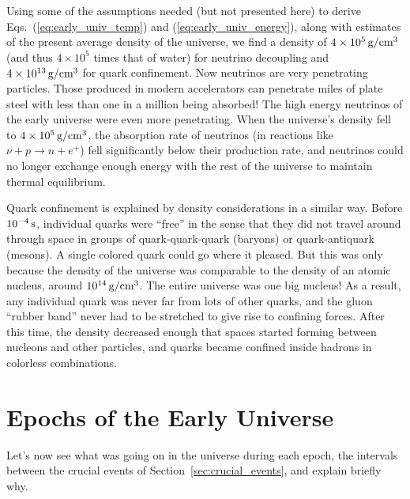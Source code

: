 Using some of the assumptions needed (but not presented here) to
derive Eqs.~(\ref{eq:early_univ_temp}) and
(\ref{eq:early_univ_energy}), along with estimates of the present
average density of the universe, we find a density of $4\times
10^5\,\mbox{g/cm$^3$}$ (and thus $4\times 10^5$ times that of water) for
neutrino decoupling and $4\times 10^{13}\,\mbox{g/cm$^3$}$ for quark
confinement.  Now neutrinos are very penetrating particles. Those
produced in modern accelerators can penetrate miles of plate steel
with less than one in a million being absorbed!  The high energy
neutrinos of the early universe were even more penetrating.  When the
universe's density fell to $4\times 10^5\,\mbox{g/cm$^3$}$, the absorption
rate of neutrinos (in reactions like $\nu+p \to n + e^+$) fell
significantly below their production rate, and neutrinos could no
longer exchange enough energy with the rest of the universe to
maintain thermal equilibrium.

Quark confinement is explained by density considerations in a similar
way.  Before $10^{-4}\,\mbox{s}$, individual quarks were ``free'' in
the sense that they did not travel around through space in groups of
quark-quark-quark (baryons) or quark-antiquark (mesons).  A single
colored quark could go where it pleased.  But this was only because
the density of the universe was comparable to the density of an atomic
nucleus, around $10^{14}\,\mbox{g/cm$^3$}$.  The entire universe was
one big nucleus!  As a result, any individual quark was never far from
lots of other quarks, and the gluon ``rubber band'' never had to be
stretched to give rise to confining forces. After this time, the
density decreased enough that spaces started forming between nucleons
and other particles, and quarks became confined inside hadrons in
colorless combinations.

\section{Epochs of the Early Universe}
\label{sec:early_universe_epochs}

Let's now see what was going on in the universe during each epoch, the
intervals between the crucial events of
Section~\ref{sec:crucial_events}, and explain briefly why.

